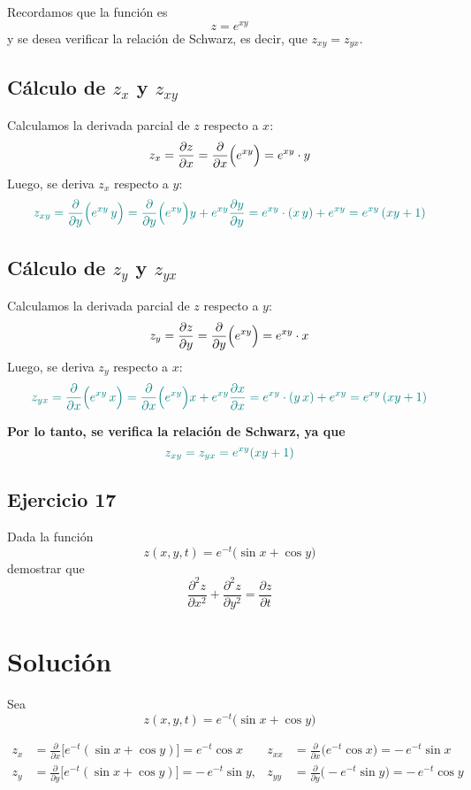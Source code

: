 \documentclass{article}
\begin{document}
Recordamos que la función es 
\[
z = e^{xy}
\]
y se desea verificar la relación de Schwarz, es decir, que \(z_{xy} = z_{yx}\).

\subsection*{Cálculo de \(z_x\) y \(z_{xy}\)}
Calculamos la derivada parcial de \(z\) respecto a \(x\):
\[
z_x = \frac{\partial z}{\partial x} = \frac{\partial}{\partial x}\Bigl(e^{xy}\Bigr) = e^{xy}\cdot y
\]
Luego, se deriva \(z_x\) respecto a \(y\):
\[\color{teal}
z_{xy} = \frac{\partial}{\partial y}\Bigl(e^{xy}\,y\Bigr)
= \frac{\partial}{\partial y}\Bigl(e^{xy}\Bigr)y + e^{xy}\frac{\partial y}{\partial y}
= e^{xy}\cdot (x\,y) + e^{xy}
= e^{xy}\,(xy+1)
\]

\subsection*{Cálculo de \(z_y\) y \(z_{yx}\)}
Calculamos la derivada parcial de \(z\) respecto a \(y\):
\[
z_y = \frac{\partial z}{\partial y} = \frac{\partial}{\partial y}\Bigl(e^{xy}\Bigr) = e^{xy}\cdot x
\]
Luego, se deriva \(z_y\) respecto a \(x\):
\[\color{teal}
z_{yx} = \frac{\partial}{\partial x}\Bigl(e^{xy}\,x\Bigr)
= \frac{\partial}{\partial x}\Bigl(e^{xy}\Bigr)x + e^{xy}\frac{\partial x}{\partial x}
= e^{xy}\cdot (y\,x) + e^{xy}
= e^{xy}\,(xy+1)
\]

\textbf{\color{teal}Por lo tanto, se verifica la relación de Schwarz, ya que}
\[ \color{teal}
z_{xy} = z_{yx} = e^{xy}(xy+1)
\]


\newpage

\subsection{Ejercicio 17}

Dada la función
\[
z(x,y,t)=e^{-t}\bigl(\sin x + \cos y\bigr)
\]
demostrar que
\[
\frac{\partial^2 z}{\partial x^2}+\frac{\partial^2 z}{\partial y^2}
=\frac{\partial z}{\partial t}
\]

\newpage
\section*{Solución}




Sea 
\[
z(x,y,t)=e^{-t}\bigl(\sin x+\cos y\bigr)
\]

\begin{align*}
z_x &= \frac{\partial}{\partial x}\bigl[e^{-t}(\sin x+\cos y)\bigr]
    = e^{-t}\cos x
    & 
z_{xx} &= \frac{\partial}{\partial x}\bigl(e^{-t}\cos x\bigr)
           = -\,e^{-t}\sin x\\
z_y &= \frac{\partial}{\partial y}\bigl[e^{-t}(\sin x+\cos y)\bigr]
    = -\,e^{-t}\sin y,
    &
z_{yy} &= \frac{\partial}{\partial y}\bigl(-e^{-t}\sin y\bigr)
           = -\,e^{-t}\cos y
\end{align*}
\end{document}
